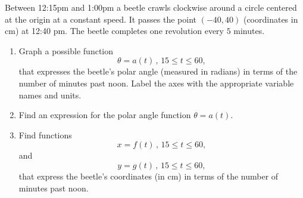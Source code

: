\documentclass{ximera}
\begin{document}
\begin{question}  \label{QLDFg4tbbfg}
Between 12:15pm and 1:00pm a beetle crawls clockwise around a circle centered at the origin at a constant speed. It passes the point $(-40,40)$ (coordinates in cm) at 12:40 pm. The beetle completes one revolution every $5$ minutes.

\begin{enumerate}
\item Graph a possible function
\[
 \theta = a(t) \, , \, 15\leq t \leq 60 ,
\]
that expresses the beetle's polar angle (measured in radians) in terms of the number of minutes past noon. Label the axes with the appropriate variable names and units.

\item Find an expression for the polar angle function $\theta = a(t)$.

\item Find functions
\[
     x = f(t) \, , \, 15 \leq t \leq 60,
\]
and
\[
     y = g(t) \, , \, 15 \leq t \leq 60,
\]
that express the beetle's coordinates (in cm) in terms of the number of minutes past noon.

\end{enumerate}

\end{question}
\end{document}
